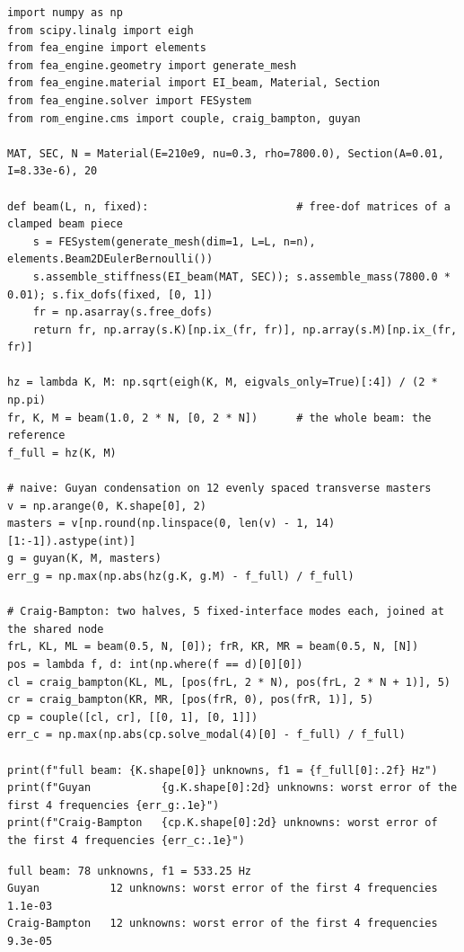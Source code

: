 \begin{lstlisting}[caption={Guyan condensation against two coupled Craig--Bampton halves, both of 12 unknowns (run from the repository root with both packages on the path).},label={lst:cm-try}]
import numpy as np
from scipy.linalg import eigh
from fea_engine import elements
from fea_engine.geometry import generate_mesh
from fea_engine.material import EI_beam, Material, Section
from fea_engine.solver import FESystem
from rom_engine.cms import couple, craig_bampton, guyan

MAT, SEC, N = Material(E=210e9, nu=0.3, rho=7800.0), Section(A=0.01, I=8.33e-6), 20

def beam(L, n, fixed):                       # free-dof matrices of a clamped beam piece
    s = FESystem(generate_mesh(dim=1, L=L, n=n), elements.Beam2DEulerBernoulli())
    s.assemble_stiffness(EI_beam(MAT, SEC)); s.assemble_mass(7800.0 * 0.01); s.fix_dofs(fixed, [0, 1])
    fr = np.asarray(s.free_dofs)
    return fr, np.array(s.K)[np.ix_(fr, fr)], np.array(s.M)[np.ix_(fr, fr)]

hz = lambda K, M: np.sqrt(eigh(K, M, eigvals_only=True)[:4]) / (2 * np.pi)
fr, K, M = beam(1.0, 2 * N, [0, 2 * N])      # the whole beam: the reference
f_full = hz(K, M)

# naive: Guyan condensation on 12 evenly spaced transverse masters
v = np.arange(0, K.shape[0], 2)
masters = v[np.round(np.linspace(0, len(v) - 1, 14)[1:-1]).astype(int)]
g = guyan(K, M, masters)
err_g = np.max(np.abs(hz(g.K, g.M) - f_full) / f_full)

# Craig-Bampton: two halves, 5 fixed-interface modes each, joined at the shared node
frL, KL, ML = beam(0.5, N, [0]); frR, KR, MR = beam(0.5, N, [N])
pos = lambda f, d: int(np.where(f == d)[0][0])
cl = craig_bampton(KL, ML, [pos(frL, 2 * N), pos(frL, 2 * N + 1)], 5)
cr = craig_bampton(KR, MR, [pos(frR, 0), pos(frR, 1)], 5)
cp = couple([cl, cr], [[0, 1], [0, 1]])
err_c = np.max(np.abs(cp.solve_modal(4)[0] - f_full) / f_full)

print(f"full beam: {K.shape[0]} unknowns, f1 = {f_full[0]:.2f} Hz")
print(f"Guyan           {g.K.shape[0]:2d} unknowns: worst error of the first 4 frequencies {err_g:.1e}")
print(f"Craig-Bampton   {cp.K.shape[0]:2d} unknowns: worst error of the first 4 frequencies {err_c:.1e}")
\end{lstlisting}

\begin{lstlisting}[numbers=none,language={},keywordstyle={},commentstyle={},frame=single,aboveskip=2pt]
full beam: 78 unknowns, f1 = 533.25 Hz
Guyan           12 unknowns: worst error of the first 4 frequencies 1.1e-03
Craig-Bampton   12 unknowns: worst error of the first 4 frequencies 9.3e-05
\end{lstlisting}

